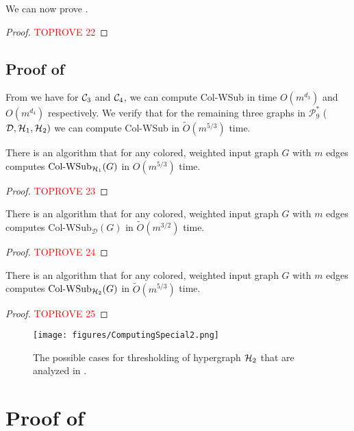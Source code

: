 \documentclass[a4paper,UKenglish,cleveref, autoref, numberwithinsect, thm-restate]{lipics-v2021}
\newcommand{\cycle}[1]{\cC_{#1}}
\newcommand{\hyperone}{\cH_1}
\newcommand{\hypertwo}{\cH_2}
\newcommand{\diamondgraph}{\cD}
\newcommand{\WSub}[2]{\mathrm{\text{Col-WSub}}_{#2}(#1)}
\newcommand{\cC}{{\cal C}}
\newcommand{\cD}{\mathcal{D}}
\newcommand{\cH}{{\cal H}}
\newcommand{\cP}{\mathcal{P}}
\begin{document}
	We can now prove .
	
	\ninestar*
	\begin{proof}\textcolor{red}{TOPROVE 22}\end{proof}
	
	\subsection{Proof of }
	
	From  we have for $\cycle{3}$ and $\cycle{4}$, we can compute Col-WSub in time $O(m^{d_3})$ and $O(m^{d_4})$ respectively. We verify that for the remaining three graphs in $\cP^*_9$ ($\diamondgraph, \hyperone, \hypertwo)$ we can compute Col-WSub in $\tilde{O}(m^{5/3})$ time.
	
	\begin{lemma}
		There is an algorithm that for any colored, weighted input graph $G$ with $m$ edges computes $\WSub{G}{\hyperone}$ in $O(m^{5/3})$ time.
	\end{lemma}
	\begin{proof}\textcolor{red}{TOPROVE 23}\end{proof}

	\begin{lemma}
		There is an algorithm that for any colored, weighted input graph $G$ with $m$ edges computes $\WSub{G}{\diamondgraph}$ in $\tilde{O}(m^{3/2})$ time.
	\end{lemma}
	\begin{proof}\textcolor{red}{TOPROVE 24}\end{proof}
	
	\begin{lemma} \label{lem:hypertwo}
		There is an algorithm that for any colored, weighted input graph $G$ with $m$ edges computes $\WSub{G}{\hypertwo}$ in $\tilde{O}(m^{5/3})$ time.
	\end{lemma}
	\begin{proof}\textcolor{red}{TOPROVE 25}\end{proof}
	
	\begin{figure}
		\centering
		\texttt{[image: figures/ComputingSpecial2.png]}\caption{The possible cases for thresholding of hypergraph $\hypertwo$ that are analyzed in .}
		\label{fig:hypertwocomp}
	\end{figure}

	
	\section{Proof of }
	
\end{document}
